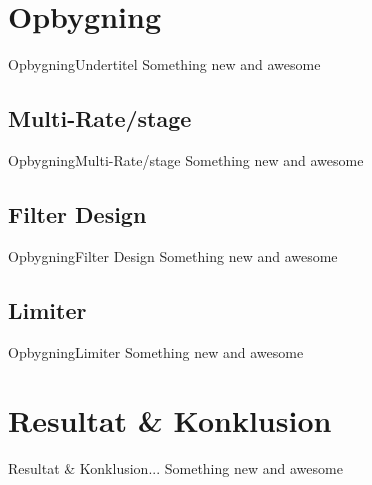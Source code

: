 
\section{Opbygning}
\begin{frame}{Opbygning}{Undertitel}
	Something new and awesome
\end{frame}

\subsection{Multi-Rate/stage}
\begin{frame}{Opbygning}{Multi-Rate/stage}
	Something new and awesome
\end{frame}


\subsection{Filter Design}
\begin{frame}{Opbygning}{Filter Design}
	Something new and awesome
\end{frame}

\subsection{Limiter}
\begin{frame}{Opbygning}{Limiter}
	Something new and awesome
\end{frame}

\section{Resultat \& Konklusion}
\begin{frame}{Resultat \& Konklusion}{...}
	Something new and awesome
\end{frame}



